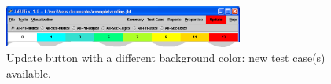 \begin{figure}[!ht]
\begin{center}
\includegraphics[width=0.70\textwidth]{fig/update-button}
\caption{\label{fig:update-button} Update button with a different
background color: new test case(s) available.}
\end{center}
\end{figure}

